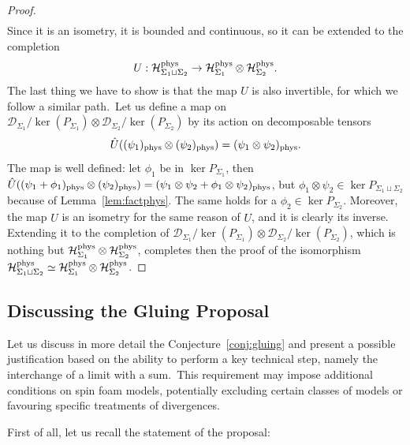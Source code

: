 \documentclass[11pt]{article}
\newcommand{\cD}{\mathcal{D}}
\newcommand{\h}{\mathcal{H}}
\theoremstyle{definition}
\numberwithin{equation}{section}
\begin{document}
\begin{proof}
\begin{equation}
\begin{split}
    \end{split}
    \end{equation}
    Since it is an isometry, it is bounded and continuous, so it can be extended to the completion 
    \begin{equation}
        U:\h^{\rm phys}_{\Sigma_1\sqcup\Sigma_2}\to \h^{\rm phys}_{\Sigma_1}\otimes \h^{\rm phys}_{\Sigma_2}.
    \end{equation}
    The last thing we have to show is that the map $U$ is also invertible, for which we follow a similar path.~Let us define a map on $\cD_{\Sigma_1}/\ker(P_{\Sigma_1})\otimes \cD_{\Sigma_2}/\ker(P_{\Sigma_2})$ by its action on decomposable tensors
    \begin{equation}
        \hat{U}((\psi_1)_{\rm phys}\otimes(\psi_2)_{\rm phys})=(\psi_1\otimes\psi_2)_{\rm phys}.
    \end{equation}
    The map is well defined: let $\phi_1$ be in $\ker P_{\Sigma_1}$, then $\hat{U}((\psi_1+\phi_1)_{\rm phys}\otimes(\psi_2)_{\rm phys})=(\psi_1\otimes\psi_2+\phi_1\otimes \psi_2)_{\rm phys}$, but $\phi_1\otimes \psi_2\in\ker P_{\Sigma_1\sqcup\Sigma_2}$ because of Lemma~\ref{lem:factphys}. The same holds for a $\phi_2\in\ker P_{\Sigma_2}$. Moreover, the map $\hat{U}$ is an isometry for the same reason of $U$, and it is clearly its inverse. Extending it to the completion of $\cD_{\Sigma_1}/\ker(P_{\Sigma_1})\otimes \cD_{\Sigma_2}/\ker(P_{\Sigma_2})$, which is nothing but $\h^{\rm phys}_{\Sigma_1}\otimes \h^{\rm phys}_{\Sigma_2}$, completes then the proof of the isomorphism $\h^{\rm phys}_{\Sigma_1\sqcup\Sigma_2}\simeq\h^{\rm phys}_{\Sigma_1}\otimes \h^{\rm phys}_{\Sigma_2}$.
\end{proof}

\subsection{Discussing the Gluing Proposal}\label{AppSec:gluing}

Let us discuss in more detail the Conjecture~\ref{conj:gluing} and present a possible justification based on the ability to perform a key technical step, namely the interchange of a limit with a sum.~This requirement may impose additional conditions on spin foam models, potentially excluding certain classes of models or favouring specific treatments of divergences.
\medskip

\noindent
First of all, let us recall the statement of the proposal:
\medskip
\end{document}
